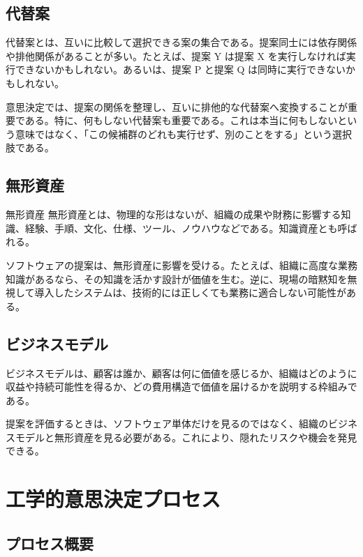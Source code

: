 \documentclass[a4paper,11pt]{article}
\begin{document}
\subsection{代替案}

代替案とは、互いに比較して選択できる案の集合である。提案同士には依存関係や排他関係があることが多い。たとえば、提案 Y は提案 X を実行しなければ実行できないかもしれない。あるいは、提案 P と提案 Q は同時に実行できないかもしれない。

意思決定では、提案の関係を整理し、互いに排他的な代替案へ変換することが重要である。特に、何もしない代替案も重要である。これは本当に何もしないという意味ではなく、「この候補群のどれも実行せず、別のことをする」という選択肢である。

\subsection{無形資産}

\begin{defbox}{無形資産}
無形資産とは、物理的な形はないが、組織の成果や財務に影響する知識、経験、手順、文化、仕様、ツール、ノウハウなどである。知識資産とも呼ばれる。
\end{defbox}

ソフトウェアの提案は、無形資産に影響を受ける。たとえば、組織に高度な業務知識があるなら、その知識を活かす設計が価値を生む。逆に、現場の暗黙知を無視して導入したシステムは、技術的には正しくても業務に適合しない可能性がある。

\subsection{ビジネスモデル}

ビジネスモデルは、顧客は誰か、顧客は何に価値を感じるか、組織はどのように収益や持続可能性を得るか、どの費用構造で価値を届けるかを説明する枠組みである。

\begin{importantbox}
提案を評価するときは、ソフトウェア単体だけを見るのではなく、組織のビジネスモデルと無形資産を見る必要がある。これにより、隠れたリスクや機会を発見できる。
\end{importantbox}

\section{工学的意思決定プロセス}

\subsection{プロセス概要}
\end{document}
